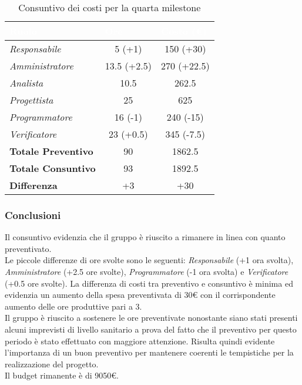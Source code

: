 \begin{table}[H]
    \renewcommand\arraystretch{1.5}
    \centering
    \begin{tabular}{|l|c|c|}
    \hline
    \rowcolor[HTML]{036400}
    \textcolor{white}{\textbf{Ruolo}} & \multicolumn{1}{l|}{\textcolor{white}{\textbf{Ore}}} & \multicolumn{1}{l|}{\textcolor{white}{\textbf{Costo (€)}}} \\ \hline
    \rowcolor[HTML]{EFEFEF}\textit{Responsabile}      & 5 (+1)       & 150 (+30)        \\ \hline
    \rowcolor[HTML]{C0C0C0}\textit{Amministratore}    & 13.5 (+2.5)  & 270 (+22.5)      \\ \hline
    \rowcolor[HTML]{EFEFEF}\textit{Analista}          & 10.5         & 262.5            \\ \hline
    \rowcolor[HTML]{C0C0C0}\textit{Progettista}       & 25           & 625              \\ \hline
    \rowcolor[HTML]{EFEFEF}\textit{Programmatore}     & 16 (-1)      & 240 (-15)        \\ \hline
    \rowcolor[HTML]{C0C0C0}\textit{Verificatore}      & 23 (+0.5)    & 345 (-7.5)       \\ \hline
    \rowcolor[HTML]{EFEFEF}\textbf{Totale Preventivo} & 90           & 1862.5           \\ \hline
    \rowcolor[HTML]{C0C0C0}\textbf{Totale Consuntivo} & 93           & 1892.5           \\ \hline
    \rowcolor[HTML]{EFEFEF}\textbf{Differenza}        & +3           & +30              \\ \hline
    \end{tabular}
    \caption{Consuntivo dei costi per la quarta milestone}
\end{table}

\subsubsection{Conclusioni}
Il consuntivo evidenzia che il gruppo è riuscito a rimanere in linea con quanto preventivato.
\\Le piccole differenze di ore svolte sono le seguenti: \textit{Responsabile} (+1 ora svolta), \textit{Amministratore} (+2.5 ore svolte), \textit{Programmatore} (-1 ora svolta) e \textit{Verificatore} (+0.5 ore svolte).
La differenza di costi tra preventivo e consuntivo è minima ed evidenzia un aumento della spesa preventivata di 30€ con il corrispondente aumento delle ore produttive pari a 3.
\\Il gruppo è riuscito a sostenere le ore preventivate nonostante siano stati presenti alcuni imprevisti di livello sanitario a prova del fatto che il preventivo per questo periodo è stato effettuato con maggiore attenzione. Risulta quindi evidente l'importanza di un buon preventivo per mantenere coerenti le tempistiche per la realizzazione del progetto.
\\Il budget rimanente è di \num{9050}€.

